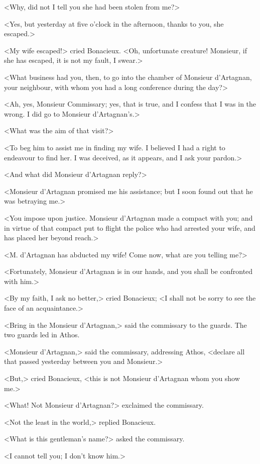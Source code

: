 <Why, did not I tell you she had been stolen from me?> 

<Yes, but yesterday at five o'clock in the afternoon, thanks to you, she escaped.> 

<My wife escaped!> cried Bonacieux. <Oh, unfortunate creature! Monsieur, if she has escaped, it is not my fault, I swear.> 

<What business had you, then, to go into the chamber of Monsieur d'Artagnan, your neighbour, with whom you had a long conference during the day?> 

<Ah, yes, Monsieur Commissary; yes, that is true, and I confess that I was in the wrong. I did go to Monsieur d'Artagnan's.> 

<What was the aim of that visit?> 

<To beg him to assist me in finding my wife. I believed I had a right to endeavour to find her. I was deceived, as it appears, and I ask your pardon.> 

<And what did Monsieur d'Artagnan reply?> 

<Monsieur d'Artagnan promised me his assistance; but I soon found out that he was betraying me.> 

<You impose upon justice. Monsieur d'Artagnan made a compact with you; and in virtue of that compact put to flight the police who had arrested your wife, and has placed her beyond reach.> 

<M. d'Artagnan has abducted my wife! Come now, what are you telling me?> 

<Fortunately, Monsieur d'Artagnan is in our hands, and you shall be confronted with him.> 

<By my faith, I ask no better,> cried Bonacieux; <I shall not be sorry to see the face of an acquaintance.> 

<Bring in the Monsieur d'Artagnan,> said the commissary to the guards. The two guards led in Athos. 

<Monsieur d'Artagnan,> said the commissary, addressing Athos, <declare all that passed yesterday between you and Monsieur.> 

<But,> cried Bonacieux, <this is not Monsieur d'Artagnan whom you show me.> 

<What! Not Monsieur d'Artagnan?> exclaimed the commissary. 

<Not the least in the world,> replied Bonacieux. 

<What is this gentleman's name?> asked the commissary. 

<I cannot tell you; I don't know him.> 

